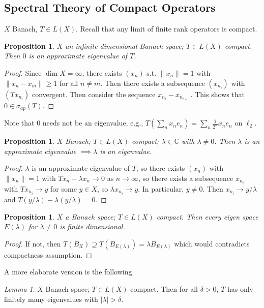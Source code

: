 \documentclass{article}
\theoremstyle{definition}
\theoremstyle{remark}
\newtheorem{lem}[defn]{Lemma}
\theoremstyle{plain}
\newtheorem{prop}[defn]{Proposition}
\newcommand{\CC}{\mathbb{C}}
\begin{document}
\subsection{Spectral Theory of Compact Operators}
$X$ Banach, $T\in L(X)$. Recall that any limit of finite rank operators is compact.
\begin{prop}
    $X$ an infinite dimensional Banach space; $T\in L(X)$ compact. Then $0$ is an approximate eigenvalue of $T$.
\end{prop}
\begin{proof}
    Since $\dim X=\infty$, there exists $(x_n)$ s.t. $\|x_n\|=1$ with $\|x_n-x_m\|\ge 1$ for all $n\neq m$. Then there exists a subsequence $(x_{n_i})$ with $(Tx_{n_i})$ convergent. Then consider the sequence $x_{n_i}-x_{n_{i+1}}$. This shows that $0\in\sigma_{ap}(T)$.
\end{proof}
Note that $0$ needs not be an eigenvalue, e.g., $T(\sum_nx_ne_n)=\sum_n\frac{1}{2^n}x_ne_n$ on $\ell_2$.
\begin{prop}
    $X$ Banach; $T\in L(X)$ compact; $\lambda\in\CC$ with $\lambda\neq0$. Then $\lambda$ is an approximate eigenvalue $\implies\lambda$ is an eigenvalue.
\end{prop}
\begin{proof}
    $\lambda$ is an approximate eigenvalue of $T$, so there exists $(x_n)$ with $\|x_n\|=1$ with $Tx_n-\lambda x_n\to 0$ as $n\to\infty$, so there exists a subsequence $x_{n_i}$ with $Tx_{n_i}\to y$ for some $y\in X$, so $\lambda x_{n_i}\to y$. In particular, $y\neq 0$. Then $x_{n_i}\to y/\lambda$ and $T(y/\lambda)-\lambda(y/\lambda)=0$.
\end{proof}
\begin{prop}
    $X$ a Banach space; $T\in L(X)$ compact. Then every eigen space $E(\lambda)$ for $\lambda\neq0$ is finite dimensional.
\end{prop}
\begin{proof}
    If not, then $T(B_X)\supseteq T(B_{E(\lambda)})=\lambda B_{E(\lambda)}$ which would contradicts compactness assumption.
\end{proof}
A more elaborate version is the following.
\begin{lem}
    $X$ Banach space; $T\in L(X)$ compact. Then for all $\delta>0$, $T$ has only finitely many eigenvalues with $|\lambda|>\delta$.
\end{lem}
\end{document}
